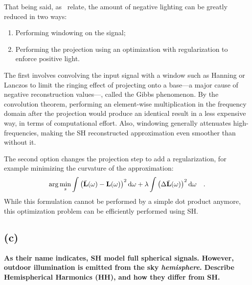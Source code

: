 \documentclass{report}
\begin{document}
That being said, as~\cite{Sloan2008} relate, the amount of negative lighting can be greatly reduced in two ways:
\begin{enumerate}
  \item{Performing windowing on the signal;}
  \item{Performing the projection using an optimization with regularization to enforce positive light.}
\end{enumerate}
The first involves convolving the input signal with a window such as Hanning or Lanczos to limit the ringing effect of projecting onto a base---a major cause of negative reconstruction values---, called the Gibbs phenomenon. By the convolution theorem, performing an element-wise multiplication in the frequency domain after the projection would produce an identical result in a less expensive way, in terms of computational effort. Also, windowing generally attenuates high-frequencies, making the SH reconstructed approximation even smoother than without it.

The second option changes the projection step to add a regularization, for example minimizing the curvature of the approximation:
\begin{equation}
\arg \min_s \int\left( \bar{\mathbf{L}}(\omega) - \mathbf{L}(\omega)\right)^2 \mathrm{d}\omega + \lambda \int \left(\Delta \bar{\mathbf{L}}(\omega)\right)^2 \mathrm{d}\omega
\quad.
\end{equation}
While this formulation cannot be performed by a simple dot product anymore, this optimization problem can be efficiently performed using SH.

\subsection{(c)}
\textbf{As their name indicates, SH model full spherical signals. However, outdoor illumination is emitted from the sky \emph{hemisphere}. Describe Hemispherical Harmonics (HH), and how they differ from SH.}
\end{document}
